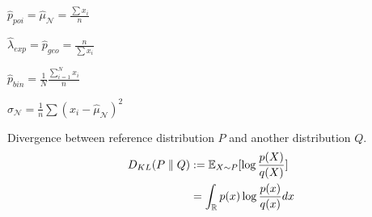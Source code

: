 \begin{definition}[MLE]
  \begin{itemize*}
    \item \(\hat{p}_{poi} = \hat{\mu}_{\mathcal{N}} = \frac{\sum x_i}{n}\)
    \item \(\hat{\lambda}_{exp} = \hat{p}_{geo} = \frac{n}{\sum x_i}\)
    \item \(\hat{p}_{bin} = \frac{1}{N}\frac{\sum_{i=1}^N x_i}{n}\)
    \item \(\hat{\sigma}_{\mathcal{N}} = \frac{1}{n}\sum(x_i - \hat{\mu}_{\mathcal{N}})^2\)
  \end{itemize*}
\end{definition}

\begin{definition}[KL-Divergence]
  Divergence between reference distribution \(P\) and another distribution \(Q\).
  \begin{align*}
    D_{KL}(P \parallel Q) &:= \operatorname{\mathbb{E}}_{X \sim P}[\log \frac{p(X)}{q(X)}] \\
    &= \int_\mathbb{R} p(x) \log \frac{p(x)}{q(x)}  dx
  \end{align*}
\end{definition}
